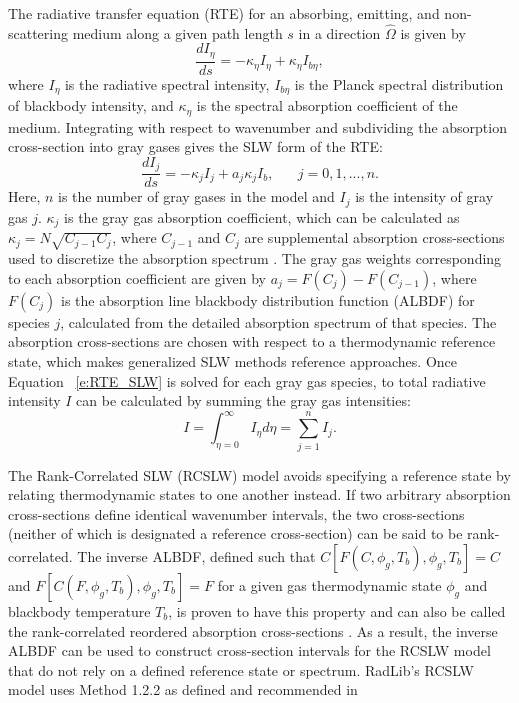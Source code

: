 \documentclass[preprint,12pt, a4paper]{elsarticle}
\begin{document}
The radiative transfer equation (RTE) for an absorbing, emitting, and non-scattering medium along a given path length $s$ in a direction $\hat{\Omega}$ is given by 
\begin{equation}
	\frac{dI_{\eta}}{ds} = -\kappa_{\eta}I_{\eta} + \kappa_{\eta}I_{b \eta},
\end{equation}
where $I_{\eta}$ is the radiative spectral intensity, $I_{b\eta}$ is the Planck spectral distribution of blackbody intensity, and $\kappa_{\eta}$ is the spectral absorption coefficient of the medium. Integrating with respect to wavenumber and subdividing the absorption cross-section into gray gases gives the SLW form of the RTE:
\begin{equation}
\label{e:RTE_SLW}
	\frac{dI_j}{ds} = -\kappa_jI_j + a_j\kappa_jI_b, \hspace{20pt} j=0,1,...,n.
\end{equation}
Here, $n$ is the number of gray gases in the model and $I_j$ is the intensity of gray gas $j$. $\kappa_j$ is the gray gas absorption coefficient, which can be calculated as $\kappa_j=N \sqrt{C_{j-1}C_j}$,
where $C_{j-1}$ and $C_j$ are supplemental absorption cross-sections used to discretize the absorption spectrum \cite{Solovjov_2001}. The gray gas weights corresponding to each absorption coefficient are given by $a_j=F(C_j)-F(C_{j-1})$, where $F(C_j)$ is the absorption line blackbody distribution function (ALBDF) for species $j$, calculated from the detailed absorption spectrum of that species. The absorption cross-sections are chosen with respect to a thermodynamic reference state, which makes generalized SLW methods reference approaches. Once Equation ~\ref{e:RTE_SLW} is solved for each gray gas species, to total radiative intensity $I$ can be calculated by summing the gray gas intensities:
\begin{equation}
	I=\int_{\eta=0}^{\infty}I_{\eta}d\eta=\sum_{j=1}^n I_j.
\end{equation}

The Rank-Correlated SLW (RCSLW) model avoids specifying a reference state by relating thermodynamic states to one another instead. If two arbitrary absorption cross-sections define identical wavenumber intervals, the two cross-sections (neither of which is designated a reference cross-section) can be said to be rank-correlated. The inverse ALBDF, defined such that $C[F(C,\phi_g,T_b),\phi_g,T_b]=C$ and $F[C(F,\phi_g,T_b),\phi_g,T_b]=F$ for a given gas thermodynamic state $\phi_g$ and blackbody temperature $T_b$, is proven to have this property and can also be called the rank-correlated reordered absorption cross-sections \cite{Solovjov_2017}. As a result, the inverse ALBDF can be used to construct cross-section intervals for the RCSLW model that do not rely on a defined reference state or spectrum. RadLib's RCSLW model uses Method 1.2.2 as defined and recommended in \cite{Solovjov_2017}
\end{document}
